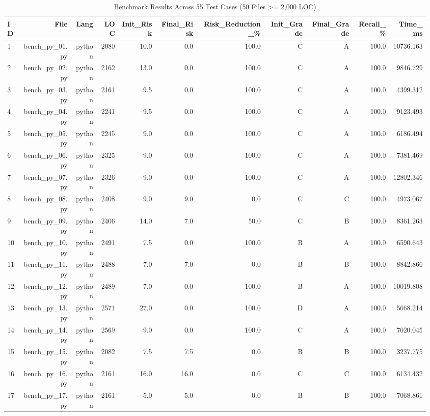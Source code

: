 \begin{table}[htbp]
\centering
\caption{Benchmark Results Across 55 Test Cases (50 Files >= 2,000 LOC)}
\label{tab:benchmark_results}
\begin{tabular}{lrrrrrrrrrr}
\hline
\textbf{ID} & \textbf{File} & \textbf{Lang} & \textbf{LOC} & \textbf{Init\_Risk} & \textbf{Final\_Risk} & \textbf{Risk\_Reduction\_\%} & \textbf{Init\_Grade} & \textbf{Final\_Grade} & \textbf{Recall\_\%} & \textbf{Time\_ms} \\
\hline
1 & bench\_py\_01.py & python & 2080 & 10.0 & 0.0 & 100.0 & C & A & 100.0 & 10736.163 \\
2 & bench\_py\_02.py & python & 2162 & 13.0 & 0.0 & 100.0 & C & A & 100.0 & 9846.729 \\
3 & bench\_py\_03.py & python & 2161 & 9.5 & 0.0 & 100.0 & C & A & 100.0 & 4399.312 \\
4 & bench\_py\_04.py & python & 2241 & 9.5 & 0.0 & 100.0 & C & A & 100.0 & 9123.493 \\
5 & bench\_py\_05.py & python & 2245 & 9.0 & 0.0 & 100.0 & C & A & 100.0 & 6186.494 \\
6 & bench\_py\_06.py & python & 2325 & 9.0 & 0.0 & 100.0 & C & A & 100.0 & 7381.469 \\
7 & bench\_py\_07.py & python & 2326 & 9.0 & 0.0 & 100.0 & C & A & 100.0 & 12802.346 \\
8 & bench\_py\_08.py & python & 2408 & 9.0 & 9.0 & 0.0 & C & C & 100.0 & 4973.067 \\
9 & bench\_py\_09.py & python & 2406 & 14.0 & 7.0 & 50.0 & C & B & 100.0 & 8361.263 \\
10 & bench\_py\_10.py & python & 2491 & 7.5 & 0.0 & 100.0 & B & A & 100.0 & 6590.643 \\
11 & bench\_py\_11.py & python & 2488 & 7.0 & 7.0 & 0.0 & B & B & 100.0 & 8842.866 \\
12 & bench\_py\_12.py & python & 2489 & 7.0 & 0.0 & 100.0 & B & A & 100.0 & 10019.808 \\
13 & bench\_py\_13.py & python & 2571 & 27.0 & 0.0 & 100.0 & D & A & 100.0 & 5668.214 \\
14 & bench\_py\_14.py & python & 2569 & 9.0 & 0.0 & 100.0 & C & A & 100.0 & 7020.045 \\
15 & bench\_py\_15.py & python & 2082 & 7.5 & 7.5 & 0.0 & B & B & 100.0 & 3237.775 \\
16 & bench\_py\_16.py & python & 2161 & 16.0 & 16.0 & 0.0 & C & C & 100.0 & 6134.432 \\
17 & bench\_py\_17.py & python & 2161 & 5.0 & 5.0 & 0.0 & B & B & 100.0 & 7068.861 \\

\end{tabular}
\end{table}
